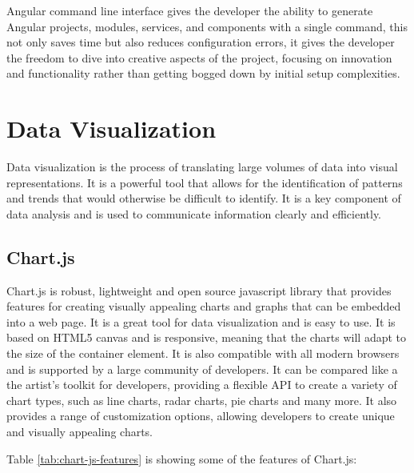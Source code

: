 Angular command line interface gives the developer the ability to generate Angular projects, modules, services, and components with a single command, this not only saves time but also reduces configuration errors, it gives the developer the freedom to dive into creative aspects of the project, focusing on innovation and functionality rather than getting bogged down by initial setup complexities.

\section{Data Visualization}

Data visualization is the process of translating large volumes of data into visual representations. It is a powerful tool that allows for the identification of patterns and trends that would otherwise be difficult to identify. It is a key component of data analysis and is used to communicate information clearly and efficiently.

\subsection{Chart.js}
Chart.js is robust, lightweight and open source javascript library that provides features for creating visually appealing charts and graphs that can be embedded into a web page. It is a great tool for data visualization and is easy to use. It is based on HTML5 canvas and is responsive, meaning that the charts will adapt to the size of the container element. It is also compatible with all modern browsers and is supported by a large community of developers. \cite{da2019learn}
It can be compared like a the artist's toolkit for developers, providing a flexible API to create a variety of chart types, such as line charts, radar charts, pie charts and many more. It also provides a range of customization options, allowing developers to create unique and visually appealing charts. \cite{da2019learn}

Table \ref{tab:chart-js-features} is showing some of the features of Chart.js\cite{da2019learn}:

